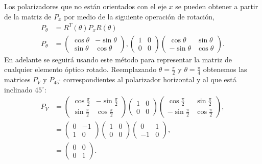 Los polarizadores que no están orientados con el eje $x$ se pueden
obtener a partir de la matriz de $P_x$ por medio de la siguiente
operación de rotación, 
\begin{align*}
P_{\theta}&=R^T(\theta)P_xR(\theta)\\
P_{\theta}
&=
\begin{pmatrix}
  \cos{\theta} &-\sin{\theta}\\\sin{\theta}&\cos{\theta}
\end{pmatrix},
\begin{pmatrix}
1 & 0 \\0& 0
\end{pmatrix}
\begin{pmatrix}
  \cos{\theta} &\sin{\theta}\\-\sin{\theta}&\cos{\theta}
\end{pmatrix}.
\end{align*}
En adelante se seguirá usando este método para representar la matriz de cualquier
elemento óptico rotado.
Reemplazando $\theta = \frac{\pi}{2}$ y $\theta = \frac{\pi}{4}$
obtenemos las matrices $P_V$ y $P_{45^{\circ}}$ correspondientes al
polarizador horizontal y al que está inclinado $45^{\circ}$:
\begin{align*}
P_{V}
&=
\begin{pmatrix}
  \cos{\frac{\pi}{2}} &-\sin{\frac{\pi}{2}}\\\sin{\frac{\pi}{2}}&\cos{\frac{\pi}{2}}
\end{pmatrix}
\begin{pmatrix}
1 & 0 \\0& 0
\end{pmatrix}
\begin{pmatrix}
  \cos{\frac{\pi}{2}} &\sin{\frac{\pi}{2}}\\-\sin{\frac{\pi}{2}}&\cos{\frac{\pi}{2}}
\end{pmatrix},\\
&=
\begin{pmatrix}
  0&-1\\1&0
\end{pmatrix}
\begin{pmatrix}
1 & 0 \\0& 0
\end{pmatrix}
\begin{pmatrix}
0 &1\\-1&0
\end{pmatrix},\\
&=
\begin{pmatrix}
0 &0\\0&1
\end{pmatrix}.\\
\end{align*}

